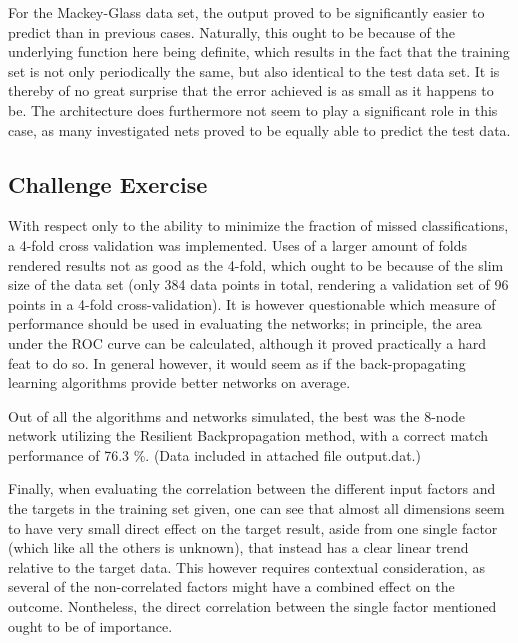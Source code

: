 \documentclass[a4paper,12pt]{article}
\theoremstyle{plain}
\theoremstyle{definition}
\begin{document}
      For the Mackey-Glass data set, the output proved to be significantly
      easier to predict than in previous cases. Naturally, this ought to be
      because of the underlying function here being definite, which results in
      the fact that the training set is not only periodically the same, but also
      identical to the test data set. It is thereby of no great surprise that
      the error achieved is as small as it happens to be. The architecture does
      furthermore not seem to play a significant role in this case, as many
      investigated nets proved to be equally able to predict the test data. 

   \subsection{Challenge Exercise}
      With respect only to the ability to minimize the fraction of missed
      classifications, a 4-fold cross validation was implemented. Uses of
      a larger amount of folds rendered results not as good as the 4-fold, which
      ought to be because of the slim size of the data set (only 384 data points
      in total, rendering a validation set of 96 points in a 4-fold
      cross-validation). It is
      however questionable which measure of performance should be used in
      evaluating the networks; in
      principle, the area under the ROC curve can be calculated, although it
      proved practically a hard feat to do so. In general however, it would 
      seem as if the back-propagating learning algorithms provide better
      networks on average. 

      Out of all the algorithms and networks simulated, the best was the 8-node
      network utilizing the Resilient Backpropagation method, with a correct
      match performance of 76.3 \%. (Data included in attached file output.dat.)

      Finally, when evaluating the correlation between the different input
      factors and the targets in the training set given, one can see that almost
      all dimensions seem to have very small direct effect on the target result,
      aside from one single factor (which like all the others is unknown), that
      instead has a clear linear trend relative to the target data. This however
      requires contextual consideration, as several of the non-correlated
      factors might have a combined effect on the outcome. Nontheless, the
      direct correlation between the single factor mentioned ought to be of
      importance.
\end{document}
